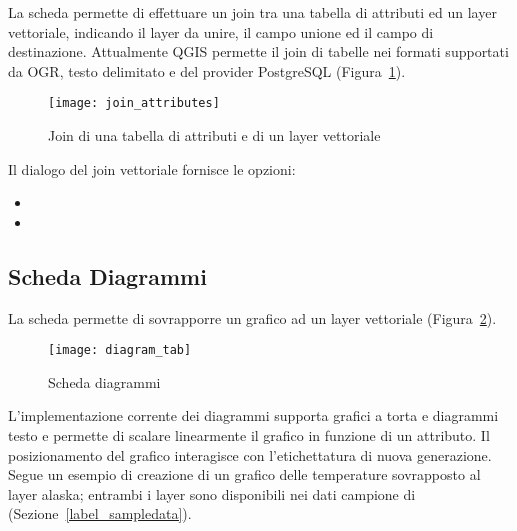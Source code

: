 La scheda  permette di effettuare un join tra una tabella di attributi ed 
un layer vettoriale, indicando il layer da unire, il campo unione ed il campo di destinazione.
Attualmente QGIS permette il join di tabelle nei formati supportati da OGR, testo delimitato 
e del provider PostgreSQL (Figura~\ref{fig:join_attributes}).

\begin{figure}[ht]
   \centering
   \texttt{[image: join\_attributes]}
   \caption{Join di una tabella di attributi e di un layer vettoriale \nixcaption}
   \label{fig:join_attributes}
\end{figure}

Il dialogo del join vettoriale fornisce le opzioni:

\begin{itemize}[label=--]
\item {}
\item {}
\end{itemize}

\subsection{Scheda Diagrammi}\label{sec:diagram}

La scheda  permette di sovrapporre un grafico ad un layer vettoriale (Figura~\ref{fig:diagramtab}).

\begin{figure}[ht]
   \centering
   \texttt{[image: diagram\_tab]}
   \caption{Scheda diagrammi \nixcaption}
   \label{fig:diagramtab}
\end{figure}

L'implementazione corrente dei diagrammi supporta grafici a torta e diagrammi testo e 
permette di scalare linearmente il grafico in funzione di un attributo.
Il posizionamento del grafico interagisce con l'etichettatura di nuova generazione. 
Segue un esempio di creazione di un grafico delle temperature
sovrapposto al layer alaska; entrambi i layer sono disponibili nei dati campione di \qg 
(Sezione~\ref{label_sampledata}).

